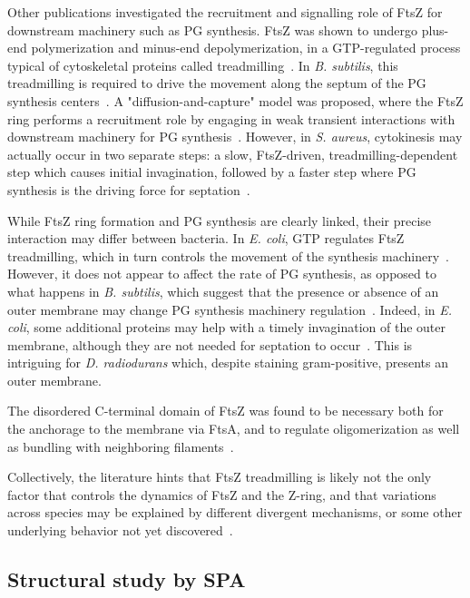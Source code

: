 Other publications investigated the recruitment and signalling role of FtsZ for downstream machinery such as PG synthesis.
FtsZ was shown to undergo plus-end polymerization and minus-end depolymerization, in a GTP-regulated process typical of cytoskeletal proteins called treadmilling~\cite{looseBacterialCellDivision2014}.
In \textit{B. subtilis}, this treadmilling is required to drive the movement along the septum of the PG synthesis centers~\cite{bisson-filhoTreadmillingFtsZFilaments2017}.
A "diffusion-and-capture" model was proposed, where the FtsZ ring performs a recruitment role by engaging in weak transient interactions with downstream machinery for PG synthesis~\cite{baranovaDiffusionCapturePermits2020}.
However, in \textit{S. aureus}, cytokinesis may actually occur in two separate steps: a slow, FtsZ-driven, treadmilling-dependent step which causes initial invagination, followed by a faster step where PG synthesis is the driving force for septation~\cite{monteiroPeptidoglycanSynthesisDrives2018}.

While FtsZ ring formation and PG synthesis are clearly linked, their precise interaction may differ between bacteria.
In \textit{E. coli}, GTP regulates FtsZ treadmilling, which in turn controls the movement of the synthesis machinery~\cite{yangGTPaseActivityCoupled2017}.
However, it does not appear to affect the rate of PG synthesis, as opposed to what happens in \textit{B. subtilis}, which suggest that the presence or absence of an outer membrane may change PG synthesis machinery regulation~\cite{yangGTPaseActivityCoupled2017}.
Indeed, in \textit{E. coli}, some additional proteins may help with a timely invagination of the outer membrane, although they are not needed for septation to occur~\cite{gerdingTransenvelopeTolPal2007}.
This is intriguing for \textit{D. radiodurans} which, despite staining gram-positive, presents an outer membrane.

The disordered C-terminal domain of FtsZ was found to be necessary both for the anchorage to the membrane via FtsA, and to regulate oligomerization as well as bundling with neighboring filaments~\cite{barrowsFtsZDynamicsBacterial2021}.

Collectively, the literature hints that FtsZ treadmilling is likely not the only factor that controls the dynamics of FtsZ and the Z-ring, and that variations across species may be explained by different divergent mechanisms, or some other underlying behavior not yet discovered~\cite{barrowsFtsZDynamicsBacterial2021}.

\subsection{Structural study by SPA}

